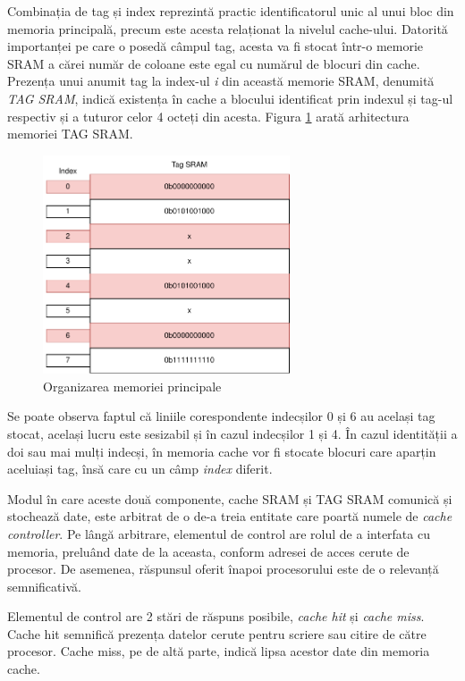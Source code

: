 \documentclass[12pt]{article}
\begin{document}
Combinația de tag și index reprezintă practic identificatorul unic al unui bloc din memoria principală, precum este acesta relaționat la nivelul cache-ului. Datorită importanței pe care o posedă câmpul tag, acesta va fi stocat într-o memorie SRAM a cărei număr de coloane este egal cu numărul de blocuri din cache. Prezența unui anumit tag la index-ul \textit{i} din această memorie SRAM, denumită \textit{TAG SRAM}, indică existența în cache a blocului identificat prin indexul și tag-ul respectiv și a tuturor celor 4 octeți din acesta. Figura \ref{Figura:43} arată arhitectura memoriei TAG SRAM.

 \begin{figure}[h!]
 \includegraphics[width=0.65\textwidth]{tagsram.pdf}
 \centering
 \caption{Organizarea memoriei principale}
 \label{Figura:43}
 \end{figure}
 
 Se poate observa faptul că liniile corespondente indecșilor 0 și 6 au același tag stocat, același lucru este sesizabil și în cazul indecșilor 1 și 4. În cazul identității a doi sau mai mulți indecși, în memoria cache vor fi stocate blocuri care aparțin aceluiași tag, însă care cu un câmp \textit{index} diferit.

Modul în care aceste două componente, cache SRAM și TAG SRAM comunică și stochează date, este arbitrat de o de-a treia entitate care poartă numele de  \textit{cache controller}. Pe lângă arbitrare, elementul de control are rolul de a interfata cu memoria, preluând date de la aceasta, conform adresei de acces cerute de procesor. De asemenea, răspunsul oferit înapoi procesorului este de o relevanță semnificativă.

 Elementul de control are 2 stări de răspuns posibile,  \textit{cache hit} și  \textit{cache miss}. Cache hit semnifică prezența datelor cerute pentru scriere sau citire de către procesor. Cache miss, pe de altă parte, indică lipsa acestor date din memoria cache.
 
\end{document}
